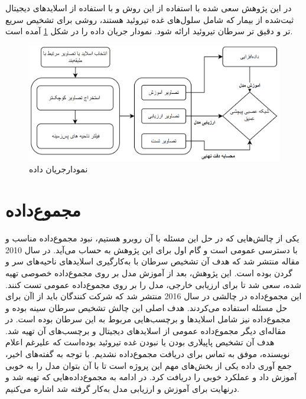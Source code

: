 
در این پژوهش سعی شده با استفاده از این روش و با استفاده از اسلاید‌های دیجیتال ثبت‌شده از بیمار که شامل سلول‌های غده تیروئید هستند، روشی برای تشخیص سریع تر و دقیق تر سرطان تیروئید ارائه شود.
نمودار جریان داده را در شکل \ref{thesis_method_flowchart} آمده است.
\begin{figure}
	\begin{center}
		\vspace{0.5cm}
		\includegraphics[width=\linewidth]{figs/suggested_methods/chart.PNG}
	\end{center}
	\caption{نمودارجریان داده}
	\label{thesis_method_flowchart}
\end{figure}

\section{مجموع‌داده}\label{sec:مجموع‌داده}
یکی از چالش‌هایی که در حل این مسئله با آن روبرو هستیم، نبود مجموع‌داده مناسب و با دسترسی عمومی است و گام اول برای این پژوهش به حساب می‌آید.
در سال 2010 مقاله \cite{halicek2019head} منتشر شد که هدف آن تشخیص سرطان با به‌کارگیری اسلاید‌های ناحیه‌های سر و گردن بوده است.
این پژوهش، بعد از آموزش مدل بر روی مجموع‌داده خصوصی تهیه شده، سعی شد تا برای ارزیابی خارجی، مدل را بر روی مجموع‌داده عمومی  تست کنند. این مجموع‌داده در چالشی در سال 2016 منتشر شد که شرکت کنندگان باید از اآن برای حل مسئله استفاده می‌کردند. هدف اصلی این چالش تشخیص سرطان سینه بوده و مجموع‌داده نیز شامل اسلاید‌ها و برچسب‌هایی مربوط به این سرطان بوده است.
در مقاله‌ای دیگر \cite{bohland2021machine} مجموع‌داده عمومی از اسلاید‌های دیجیتال و برچسب‌های آن تهیه شد. هدف آن تشخیص پاپیلاری بودن یا نبودن غده تیروئید بوده‌است که علیرغم اعلام نویسنده، موفق به تماس برای دریافت مجموع‌داده نشدیم.
با توجه به گفته‌های اخیر، جمع آوری داده یکی از بخش‌های مهم این پروژه است تا با آن بتوان مدل را به خوبی آموزش داد و عملکرد خوبی را دریافت کرد.
در ادامه به مجموع‌داده‌هایی که تهیه شد و درنهایت برای آموزش و ارزیابی مدل به‌کار گرفته شد اشاره می‌کنیم.

